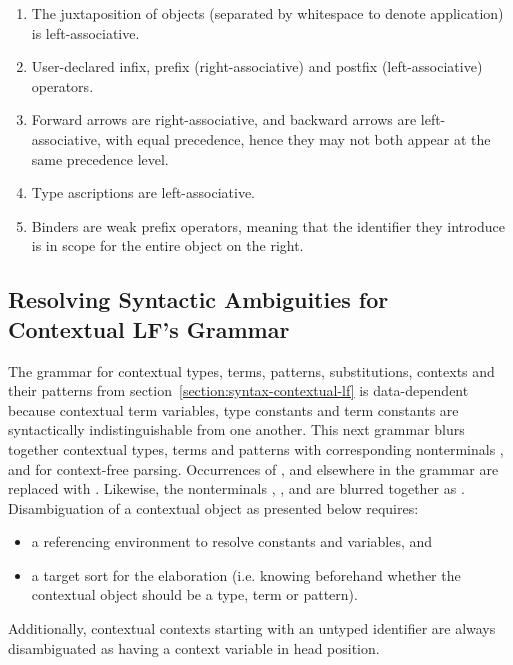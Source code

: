 \begin{enumerate}
\item The juxtaposition of \LF objects (separated by whitespace to denote application) is left-associative.
\item User-declared infix, prefix (right-associative) and postfix (left-associative) operators.
\item Forward arrows are right-associative, and backward arrows are left-associative, with equal precedence, hence they may not both appear at the same precedence level.
\item Type ascriptions are left-associative.
\item Binders are weak prefix operators, meaning that the identifier they introduce is in scope for the entire \LF object on the right.
\end{enumerate}

\subsection{Resolving Syntactic Ambiguities for Contextual \acs{LF}'s Grammar}

The grammar for contextual \LF types, terms, patterns, substitutions, contexts and their patterns from section~\ref{section:syntax-contextual-lf} is data-dependent because contextual \LF term variables, type constants and term constants are syntactically indistinguishable from one another.
This next grammar blurs together contextual \LF types, terms and patterns with corresponding nonterminals ,  and  for context-free parsing.
Occurrences of ,  and  elsewhere in the grammar are replaced with .
Likewise, the nonterminals , ,  and  are blurred together as .
Disambiguation of a contextual \LF object as presented below requires:
\begin{itemize}
\item a referencing environment to resolve constants and variables, and
\item a target sort for the elaboration (i.e. knowing beforehand whether the contextual \LF object should be a type, term or pattern).
\end{itemize}
Additionally, contextual \LF contexts starting with an untyped identifier are always disambiguated as having a context variable in head position.

